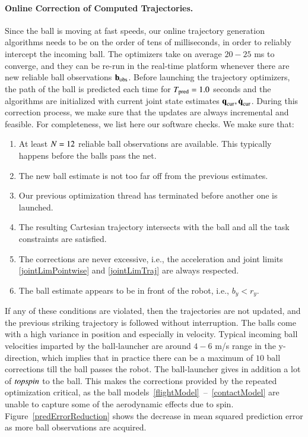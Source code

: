 \paragraph{\textbf{Online Correction of Computed Trajectories}.} Since the ball is moving at fast speeds, our online trajectory generation algorithms needs to be on the order of tens of milliseconds, in order to reliably intercept the incoming ball. The optimizers take on average $20-25$ ms to converge, and they can be re-run in the real-time platform whenever there are new reliable ball observations $\boldsymbol{\mathrm{b}}_\mathrm{obs}$. Before launching the trajectory optimizers, the path of the ball is predicted each time for $T_{\mathrm{pred}} = 1.0$ seconds and the algorithms are initialized with current joint state estimates $\boldsymbol{\mathrm{q}}_{\textrm{cur}}, \dot{\boldsymbol{\mathrm{q}}}_{\textrm{cur}}$. During this correction process, we make sure that the updates are always incremental and feasible. For completeness, we list here our software checks. We make sure that:
%
\begin{enumerate}
	\item At least $N = 12$ reliable ball observations are available. This typically happens before the balls pass the net.
	\item The new ball estimate is not too far off from the previous estimates.
	\item Our previous optimization thread has terminated before another one is launched.
	\item The resulting Cartesian trajectory intersects with the ball and all the task constraints are satisfied.
	\item The corrections are never excessive, i.e., the acceleration and joint limits \eqref{jointLimPointwise} and \eqref{jointLimTraj} are always respected.
	\item The ball estimate appears to be in front of the robot, i.e., $b_y < r_y$.
\end{enumerate}
%
If any of these conditions are violated, then the trajectories are not updated, and the previous striking trajectory is followed without interruption. 
%
%
The balls come with a high variance in position and especially in velocity. Typical incoming ball velocities imparted by the ball-launcher are around $4-6$ m/s range in the y-direction, which implies that in practice there can be a maximum of $10$ ball corrections till the ball passes the robot. The ball-launcher gives in addition a lot of $\emph{topspin}$ to the ball. This makes the corrections provided by the repeated optimization critical, as the ball models~\mbox{\eqref{flightModel} -- \eqref{contactModel}} are unable to capture some of the aerodynamic effects due to spin. Figure~\ref{predErrorReduction} shows the decrease in mean squared prediction error as more ball observations are acquired.
